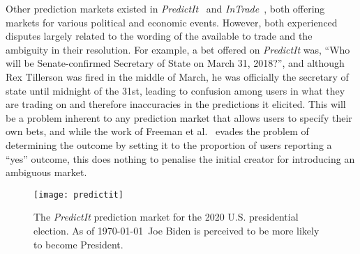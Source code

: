 Other prediction markets existed in \emph{PredictIt}~\cite{PredictIt} and
\emph{InTrade}~\cite{InTrade}, both offering markets for various political and
economic events. However, both experienced disputes largely related to the
wording of the available to trade and the ambiguity in their resolution. For
example, a bet offered on \emph{PredictIt} was, ``Who will be Senate-confirmed
Secretary of State on March 31, 2018?'', and although Rex Tillerson was fired
in the middle of March, he was officially the secretary of state until midnight
of the 31st, leading to confusion among users in what they are trading on and
therefore inaccuracies in the predictions it elicited. This will be a problem
inherent to any prediction market that allows users to specify their own bets,
and while the work of Freeman et al.~\cite{Freeman2017} evades the problem of
determining the outcome by setting it to the proportion of users reporting a
``yes'' outcome, this does nothing to penalise the initial creator for
introducing an ambiguous market.

\begin{figure}[h]
	\centering
	\texttt{[image: predictit]}
	\caption{The \emph{PredictIt} prediction market for the 2020 U.S.
	presidential election. As of \today\ Joe Biden is perceived to be more
	likely to become President.}
	\label{fig:predictit}
\end{figure}

